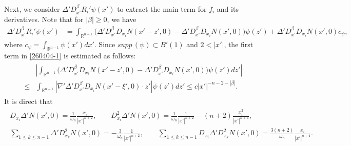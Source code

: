 \documentclass{amsart}
\numberwithin{equation}{section}
\newcommand{\abs}[1]{\left| #1 \right|}
\newcommand{\om}{{ \omega  }}
\newcommand{\na}{\nabla}
\newcommand {\be}{\beta}
\newcommand{\Rn}{{\mathbb R}^{n-1}}
\newcommand{\De}{\Delta}
\begin{document}
Next, we consider $\De' D^\be_{x'}     R_i'  \psi (x') $ to extract the main term for $f_i$ and its derivatives. Note that   for $|\be| \geq 0$, we have 
\begin{align}\label{260404-1}
\De' D^\be_{x'}     R_i'  \psi (x') &  =\int_{\Rn} \Big( \De'  D^\be_{x'}  D_{x_i}    N(x'-z', 0) -\De'  D^\be_{x'}  D_{x_i}  N(x', 0)\Big) \psi(z')  + \De'   D^\be_{x'}   D_{x_i} N(x', 0) c_\psi,
\end{align}
where $ c_\psi = \int_{\Rn} \psi(x') dx'$. 
 Since $ supp\, (\psi) \subset B'(1)$ and $2< |x'|$, the first term in \eqref{260404-1} is estimated as follows:
\begin{align}\label{260404-2}
\begin{split}
 &\abs{\int_{\Rn} \Big( \De'  D^\be_{x'}   D_{x_i}   N(x'-z', 0) -\De' D_{x'}^\be  D_{x_i}  N(x', 0)\Big) \psi(z') dz'  }\\
 \leq    &\int_{\Rn}   \abs{\na' \De'  D^\be_{x'}   D_{x_i}  N(x'-\xi', 0)  \cdot z'} \psi(z') dz'
  \leq  c |x'|^{-n -2-|\be|}.
 \end{split}
\end{align}
It is direct that
\begin{align}\label{260403-2}
\begin{split}
   D_{x_i} \De' N(x',0)   =  \frac{1}{\om_n} \frac{x_i } {|x'|^{n+2}},\qquad 
       D^2 _{x_i} \De'   N(x', 0)    =  \frac{1}{\om_n}    \frac{1} {|x'|^{n+2}} - (n+2) \frac{x_i^2} {|x'|^{n+4}},\\
      \sum_{1 \leq k \leq n-1} \De'  D^2_{x_k} N(x', 0)    = - \frac{3}{\om_n}  \frac1{|x'|^{n+2}},\qquad 
           \sum_{1 \leq k \leq n-1}  D_{x_i} \De'  D^2_{x_k} N(x', 0)    =  \frac{3(n+2)}{\om_n}  \frac{x_i }{|x'|^{n+4}}.
           \end{split}
   \end{align}
\end{document}
